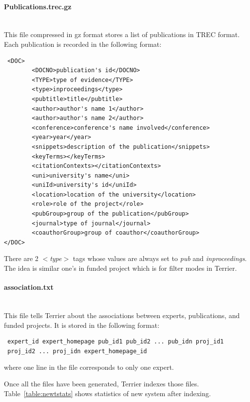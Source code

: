\paragraph{Publications.trec.gz} \hspace{0pt} \\
This file compressed in gz format stores a list of publications in TREC format. Each publication is recorded in the following format:
\begin{verbatim}
 <DOC>
        <DOCNO>publication's id</DOCNO>
        <TYPE>type of evidence</TYPE>
        <type>inproceedings</type>
        <pubtitle>title</pubtitle>
        <author>author's name 1</author>
        <author>author's name 2</author>
        <conference>conference's name involved</conference>
        <year>year</year>
        <snippets>description of the publication</snippets>
        <keyTerms></keyTerms>
        <citationContexts></citationContexts>
        <uni>university's name</uni>
        <uniId>university's id</uniId>
        <location>location of the university</location>
        <role>role of the project</role>
        <pubGroup>group of the publication</pubGroup>
        <journal>type of journal</journal>
        <coauthorGroup>group of coauthor</coauthorGroup>
</DOC>
\end{verbatim}
There are 2 \textit{$<$type$>$} tags whose values are always set to \textit{pub} and \textit{inproceedings}. The idea is similar one's in 
funded project which is for filter modes in Terrier.

\paragraph{association.txt} \hspace{0pt} \\
This file tells Terrier about the associations between experts, publications, and funded projects. It is stored in the following format:
\begin{verbatim}
 expert_id expert_homepage pub_id1 pub_id2 ... pub_idn proj_id1 
 proj_id2 ... proj_idn expert_homepage_id
\end{verbatim}
where one line in the file corresponds to only one expert.

Once all the files have been generated, Terrier indexes those files. Table~\ref{table:newtstats} shows statistics of new system after indexing.

\begin{table}
\centering
{}
\caption{Statistics of New System After Indexing Process} \label{table:newtstats}
\end{table}



